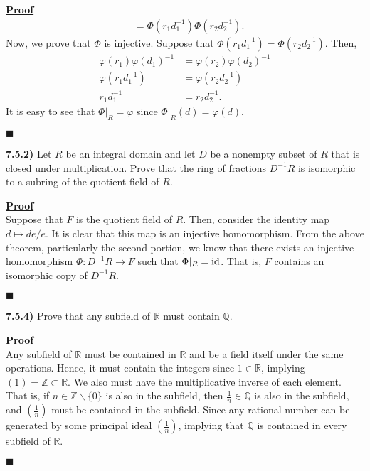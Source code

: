 \documentclass[12pt,a4paper]{article}
\newcommand{\prob}[2]{\textbf{#1)} #2}
\newenvironment{proof}
{
\textbf{\underline{Proof}} \\
}
{
\hfill $\blacksquare$
}
\begin{document}
\begin{proof}
\begin{align*}
        &= \Phi\left( r_1 d_1^{-1} \right)\Phi\left( r_2 d_2^{-1} \right)
    .\end{align*}
    Now, we prove that $\Phi$ is injective.
    Suppose that $\Phi\left( r_1 d_1^{-1} \right) = \Phi\left( r_2 d_2^{-1} \right)$.
    Then, 
    \begin{align*}
        \varphi\left( r_1 \right)\varphi\left( d_1 \right)^{-1} &= \varphi\left( r_2 \right)\varphi\left( d_2 \right)^{-1} \\
        \varphi\left( r_1 d_1^{-1} \right) &= \varphi\left( r_2 d_2^{-1} \right) \\
        r_1 d_1^{-1} &= r_2 d_2^{-1}
    .\end{align*}
    It is easy to see that $\Phi|_{R} = \varphi$ since $\Phi|_{R}\left( d \right) = \varphi\left( d \right)$.
\end{proof}

\prob{7.5.2}{
Let $R$ be an integral domain and let $D$ be a nonempty subset of $R$ that is closed under multiplication.
Prove that the ring of fractions $D^{-1}R$ is isomorphic to a subring of the quotient field of $R$.
}

\begin{proof}
    Suppose that $F$ is the quotient field of $R$.
    Then, consider the identity map $d \mapsto de/e$.
    It is clear that this map is an injective homomorphism.
    From the above theorem, particularly the second portion, we know that there exists an injective homomorphism $\Phi: D^{-1}R \to F$ such that $\Phi|_{R} = {\rm id}$.
    That is, $F$ contains an isomorphic copy of $D^{-1}R$.
\end{proof}

\prob{7.5.4}{
Prove that any subfield of $\mathbb{R}$ must contain $\mathbb{Q}$.
}
 
\begin{proof}
    Any subfield of $\mathbb{R}$ must be contained in $\mathbb{R}$ and be a field itself under the same operations.
    Hence, it must contain the integers since $1 \in \mathbb{R}$, implying $(1) = \mathbb{Z} \subset \mathbb{R}$.
    We also must have the multiplicative inverse of each element.
    That is, if $n \in \mathbb{Z} \backslash \{ 0 \} $ is also in the subfield, then $\frac{1}{n} \in \mathbb{Q}$ is also in the subfield, and $\left( \frac{1}{n} \right)$ must be contained in the subfield.
    Since any rational number can be generated by some principal ideal $\left( \frac{1}{n} \right)$, implying that $\mathbb{Q}$ is contained in every subfield of $\mathbb{R}$.
\end{proof}
\end{document}
